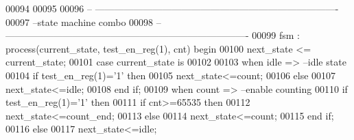 \begin{DoxyCode}
00094 
00095 
00096 \textcolor{keyword}{-- ----------------------------------------------------------------------------}
00097 \textcolor{keyword}{--state machine combo}
00098 \textcolor{keyword}{-- ----------------------------------------------------------------------------}
00099 fsm : \textcolor{keywordflow}{process}(current_state, test_en_reg(\textcolor{vhdllogic}{1}), cnt) \textcolor{keywordflow}{begin}
00100     \textcolor{vhdlchar}{next_state} \textcolor{vhdlchar}{<=} \textcolor{vhdlchar}{current_state};
00101     \textcolor{keywordflow}{case} \textcolor{vhdlchar}{current_state} \textcolor{keywordflow}{is}
00102       
00103         \textcolor{keywordflow}{when} \textcolor{vhdlchar}{idle} \textcolor{vhdlchar}{=}\textcolor{vhdlchar}{>}\textcolor{keyword}{                    --idle state}
00104             \textcolor{keywordflow}{if} \textcolor{vhdlchar}{test_en_reg}\textcolor{vhdlchar}{(}\textcolor{vhdllogic}{}\textcolor{vhdllogic}{1}\textcolor{vhdlchar}{)}\textcolor{vhdlchar}{=}\textcolor{vhdlchar}{'}\textcolor{vhdllogic}{}\textcolor{vhdllogic}{1}\textcolor{vhdlchar}{'} \textcolor{keywordflow}{then} 
00105                 \textcolor{vhdlchar}{next_state}\textcolor{vhdlchar}{<=}\textcolor{vhdlchar}{count};
00106             \textcolor{keywordflow}{else} 
00107                 \textcolor{vhdlchar}{next_state}\textcolor{vhdlchar}{<=}\textcolor{vhdlchar}{idle};
00108             \textcolor{keywordflow}{end} \textcolor{keywordflow}{if};
00109         \textcolor{keywordflow}{when} \textcolor{vhdlchar}{count} \textcolor{vhdlchar}{=}\textcolor{vhdlchar}{>}\textcolor{keyword}{                   --enable counting}
00110             \textcolor{keywordflow}{if} \textcolor{vhdlchar}{test_en_reg}\textcolor{vhdlchar}{(}\textcolor{vhdllogic}{}\textcolor{vhdllogic}{1}\textcolor{vhdlchar}{)}\textcolor{vhdlchar}{=}\textcolor{vhdlchar}{'}\textcolor{vhdllogic}{}\textcolor{vhdllogic}{1}\textcolor{vhdlchar}{'} \textcolor{keywordflow}{then}
00111                 \textcolor{keywordflow}{if} \textcolor{vhdlchar}{cnt}\textcolor{vhdlchar}{>=}\textcolor{vhdllogic}{}\textcolor{vhdllogic}{65535} \textcolor{keywordflow}{then} 
00112                     \textcolor{vhdlchar}{next_state}\textcolor{vhdlchar}{<=}\textcolor{vhdlchar}{count\_end};
00113                 \textcolor{keywordflow}{else} 
00114                     \textcolor{vhdlchar}{next_state}\textcolor{vhdlchar}{<=}\textcolor{vhdlchar}{count};
00115                 \textcolor{keywordflow}{end} \textcolor{keywordflow}{if};
00116             \textcolor{keywordflow}{else} 
00117                 \textcolor{vhdlchar}{next_state}\textcolor{vhdlchar}{<=}\textcolor{vhdlchar}{idle};

\end{DoxyCode}
